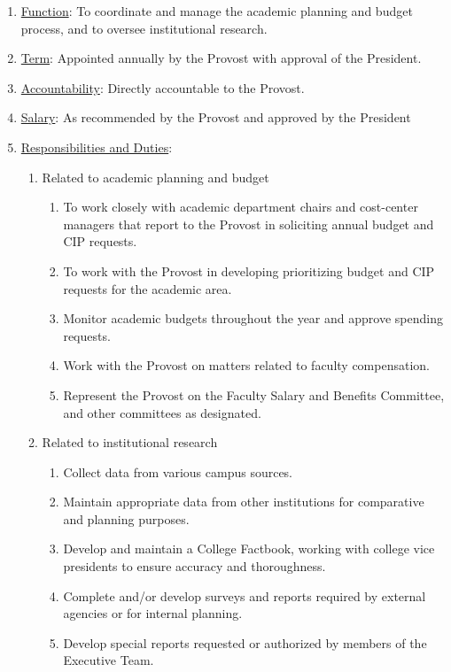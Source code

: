 \documentclass[letterpaper, 11pt]{article}
\begin{document}
					\begin{enumerate}
						\item{\underline{Function}:  To coordinate and manage the academic planning and budget process, and to oversee institutional research.}
						\item{\underline{Term}:  Appointed annually by the Provost with approval of the President.}
						\item{\underline{Accountability}:  Directly accountable to the Provost.}
						\item{\underline{Salary}:  As recommended by the Provost and approved by the President}
						\item{\underline{Responsibilities and Duties}:
							\begin{enumerate}
								\item{Related to academic planning and budget
									\begin{enumerate}
										\item{To work closely with academic department chairs and cost-center managers that report to the Provost in soliciting annual budget and CIP requests.}
										\item{To work with the Provost in developing prioritizing budget and CIP requests for the academic area.}
										\item{Monitor academic budgets throughout the year and approve spending requests.}
										\item{Work with the Provost on matters related to faculty compensation.}
										\item{Represent the Provost on the Faculty Salary and Benefits Committee, and other committees as designated.}
									\end{enumerate}
								}
								\item{Related to institutional research
									\begin{enumerate}
										\item{Collect data from various campus sources.}
										\item{Maintain appropriate data from other institutions for comparative and planning purposes.}
										\item{Develop and maintain a College Factbook, working with college vice presidents to ensure accuracy and thoroughness.}
										\item{Complete and/or develop surveys and reports required by external agencies or for internal planning.}
										\item{Develop special reports requested or authorized by members of the Executive Team.}
									\end{enumerate}
								}
							\end{enumerate}
						}
					\end{enumerate}
\end{document}
